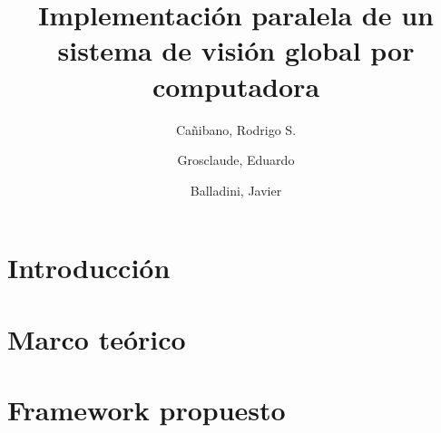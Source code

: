 \documentclass[11pt,a4paper,spanish]{book}
\title{Implementación paralela de un sistema de visión global por computadora}
\author{Cañibano, Rodrigo S.\and Grosclaude, Eduardo \and Balladini, Javier}
\begin{document}
\maketitle

\chapter{Introducción}











\chapter{Marco teórico}





\chapter{Framework propuesto}






\end{document}
